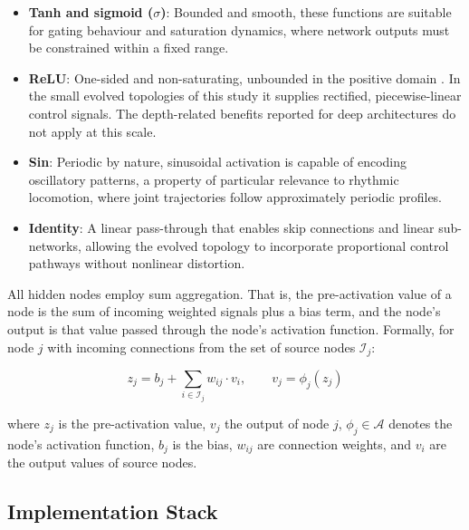 \documentclass[12pt]{article}
\newcommand{\revNota}[2]{#2}
\begin{document}
\begin{itemize}
    \item \textbf{Tanh and sigmoid ($\sigma$)}: Bounded and smooth, these functions are suitable for gating behaviour and saturation dynamics, where network outputs must be constrained within a fixed range.
    \item \textbf{ReLU}: One-sided and non-saturating, unbounded in the positive domain \parencite{nair_rectified_2010}. In the small evolved topologies of this study it supplies rectified, piecewise-linear control signals. The depth-related benefits reported for deep architectures do not apply at this scale.
    \item \textbf{Sin}: Periodic by nature, sinusoidal activation is capable of encoding oscillatory patterns, a property of particular relevance to rhythmic locomotion, where joint trajectories follow approximately periodic profiles.
    \item \textbf{Identity}: A linear pass-through that enables skip connections and linear sub-networks, allowing the evolved topology to incorporate proportional control pathways without nonlinear distortion.
\end{itemize}


All hidden nodes employ sum aggregation.
That is, \revNota{N-04}{the pre-activation value of a node is the sum of incoming weighted signals plus a bias term, and the node's output is that value passed through the node's activation function}.
Formally, for node $j$ with incoming connections from the set of source nodes $\mathcal{I}_j$:

\[z_j = b_j + \sum_{i \in \mathcal{I}_j} w_{ij} \cdot v_i, \qquad v_j = \phi_j(z_j)\]

where $z_j$ is the pre-activation value, $v_j$ the output of node $j$, $\phi_j \in \mathcal{A}$ denotes the node's activation function, $b_j$ is the bias, $w_{ij}$ are connection weights, and $v_i$ are the output values of source nodes.

\subsection{Implementation Stack}
\label{subsec:implementation-stack}
\end{document}
